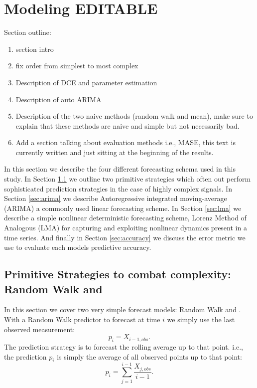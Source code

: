 \section{Modeling {\color{blue} EDITABLE}}\label{sec:model}


Section outline:

\begin{enumerate}
\item \cmark section intro
\item \cmark fix order from simplest to most complex
\item Description of DCE and parameter estimation  
\item\cmark Description of auto ARIMA 
\item \cmark Description of the two naive methods (random walk and mean), make sure to explain that these methods are naive and simple but not necessarily bad.
\item\cmark Add a section talking about evaluation methods i.e., MASE, this text is currently written and just sitting at the beginning of the results. 

\end{enumerate}

In this section we describe the four different forecasting schema used in this study. In Section \ref{sec:simple} we outline two primitive strategies which often out perform sophisticated prediction strategies in the case of highly complex signals. In Section \ref{sec:arima} we describe Autoregressive integrated moving-average (ARIMA) a commonly used linear forecasting scheme. In Section \ref{sec:lma} we describe a simple nonlinear deterministic forecasting scheme, Lorenz Method of Analogous (LMA) for capturing and exploiting nonlinear dynamics present in a time series. And finally in Section \ref{sec:accuracy} we discuss the error metric we use to evaluate each models predictive accuracy.



\subsection{Primitive Strategies to combat complexity: Random Walk and }\label{sec:simple}
In this section we cover two very simple forecast models: Random Walk and \naive. With a Random Walk predictor to forecast at time $i$ we simply use the last observed measurement: $$p_i = X_{i-1,obs}.$$ The \naive  prediction strategy is to forecast the rolling average up to that point. i.e., the prediction $p_i$ is simply the average of all observed points up to that point: $$p_i = \sum_{j=1}^{i-1}\frac{X_{j,obs}}{i-1}.$$

